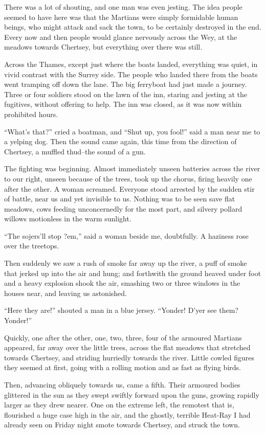 There was a lot of shouting, and one man was even jesting. The idea
people seemed to have here was that the Martians were simply
formidable human beings, who might attack and sack the town, to be
certainly destroyed in the end. Every now and then people would
glance nervously across the Wey, at the meadows towards Chertsey,
but everything over there was still.

Across the Thames, except just where the boats landed, everything
was quiet, in vivid contrast with the Surrey side. The people who
landed there from the boats went tramping off down the lane. The
big ferryboat had just made a journey. Three or four soldiers stood
on the lawn of the inn, staring and jesting at the fugitives,
without offering to help. The inn was closed, as it was now within
prohibited hours.

``What's that?'' cried a boatman, and ``Shut up, you fool!'' said a man
near me to a yelping dog. Then the sound came again, this time from
the direction of Chertsey, a muffled thud--the sound of a gun.

The fighting was beginning. Almost immediately unseen batteries
across the river to our right, unseen because of the trees, took up
the chorus, firing heavily one after the other. A woman screamed.
Everyone stood arrested by the sudden stir of battle, near us and
yet invisible to us. Nothing was to be seen save flat meadows, cows
feeding unconcernedly for the most part, and silvery pollard
willows motionless in the warm sunlight.

``The sojers'll stop ?em,'' said a woman beside me, doubtfully. A
haziness rose over the treetops.

Then suddenly we saw a rush of smoke far away up the river, a puff
of smoke that jerked up into the air and hung; and forthwith the
ground heaved under foot and a heavy explosion shook the air,
smashing two or three windows in the houses near, and leaving us
astonished.

``Here they are!'' shouted a man in a blue jersey. ``Yonder! D'yer see
them? Yonder!''

Quickly, one after the other, one, two, three, four of the armoured
Martians appeared, far away over the little trees, across the flat
meadows that stretched towards Chertsey, and striding hurriedly
towards the river. Little cowled figures they seemed at first,
going with a rolling motion and as fast as flying birds.

Then, advancing obliquely towards us, came a fifth. Their armoured
bodies glittered in the sun as they swept swiftly forward upon the
guns, growing rapidly larger as they drew nearer. One on the
extreme left, the remotest that is, flourished a huge case high in
the air, and the ghostly, terrible Heat-Ray I had already seen on
Friday night smote towards Chertsey, and struck the town.

